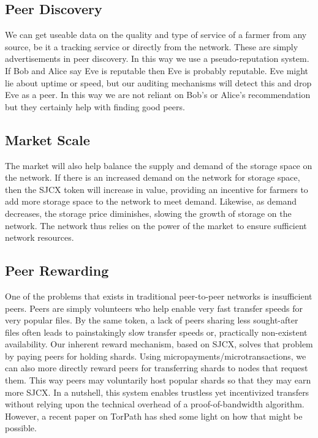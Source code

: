\documentclass[a4paper,10pt]{article}
\begin{document}
\subsection{Peer Discovery}
We can get useable data on the quality and type of service of a farmer from any source, be it a tracking service or directly from the network. These are simply advertisements in peer discovery. In this way we use a pseudo-reputation system. If Bob and Alice say Eve is reputable then Eve is probably reputable. Eve might lie about uptime or speed, but our auditing mechanisms will detect this and drop Eve as a peer. In this way we are not reliant on Bob’s or Alice’s recommendation but they certainly help with finding good peers.

\subsection{Market Scale}
The market will also help balance the supply and demand of the storage space on the network. If there is an increased demand on the network for storage space, then the SJCX token will increase in value, providing an incentive for farmers to add more storage space to the network to meet demand. Likewise, as demand decreases, the storage price diminishes, slowing the growth of storage on the network. The network thus relies on the power of the market to ensure sufficient network resources. 

\subsection{Peer Rewarding}
One of the problems that exists in traditional peer-to-peer networks is insufficient peers. Peers are simply volunteers who help enable very fast transfer speeds for very popular files. By the same token, a lack of peers sharing less sought-after files often leads to painstakingly slow transfer speeds or, practically non-existent availability. Our inherent reward mechanism, based on SJCX, solves that problem by paying peers for holding shards. Using micropayments/microtransactions, we can also more directly reward peers for transferring shards to nodes that request them. This way peers may voluntarily host popular shards so that they may earn more SJCX. In a nutshell, this system enables trustless yet incentivized transfers without relying upon the technical overhead of a proof-of-bandwidth algorithm. However, a recent paper on TorPath \cite{14} has shed some light on how that might be possible. 
\end{document}
